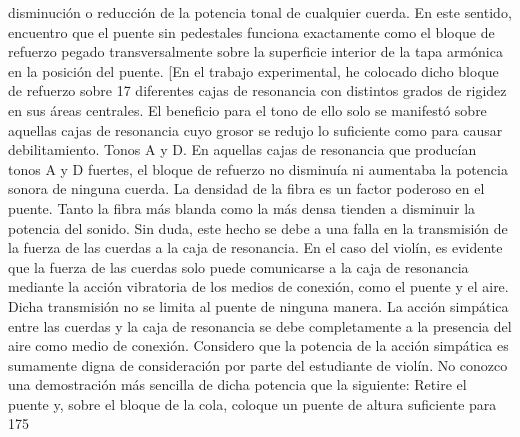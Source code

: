 disminución o reducción de la potencia tonal de cualquier cuerda. En este sentido, encuentro que el puente sin pedestales funciona exactamente como el bloque de refuerzo pegado transversalmente sobre la superficie interior de la tapa armónica en la posición del puente.
[En el trabajo experimental, he colocado dicho bloque de refuerzo sobre 17 diferentes cajas de resonancia con distintos grados de rigidez en sus áreas centrales. El beneficio para el tono de ello solo se manifestó sobre aquellas cajas de resonancia cuyo grosor se redujo lo suficiente como para causar debilitamiento.
Tonos A y D. En aquellas cajas de resonancia que producían tonos A y D fuertes, el bloque de refuerzo no disminuía ni aumentaba la potencia sonora de ninguna cuerda.
La densidad de la fibra es un factor poderoso en el puente. Tanto la fibra más blanda como la más densa tienden a disminuir la potencia del sonido. Sin duda, este hecho se debe a una falla en la transmisión de la fuerza de las cuerdas a la caja de resonancia. En el caso del violín, es evidente que la fuerza de las cuerdas solo puede comunicarse a la caja de resonancia mediante la acción vibratoria de los medios de conexión, como el puente y el aire. Dicha transmisión no se limita al puente de ninguna manera. La acción simpática entre las cuerdas y la caja de resonancia se debe completamente a la presencia del aire como medio de conexión. Considero que la potencia de la acción simpática es sumamente digna de consideración por parte del estudiante de violín. No conozco una demostración más sencilla de dicha potencia que la siguiente: Retire el puente y, sobre el bloque de la cola, coloque un puente de altura suficiente para
175

